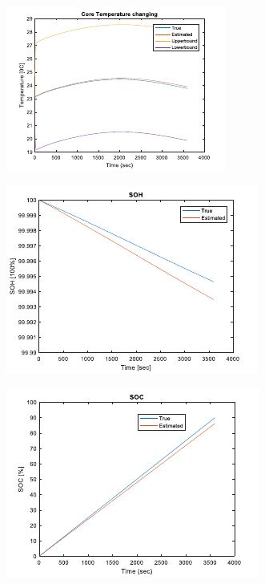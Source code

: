 \documentclass[12pt]{article}
\begin{document}
\begin{figure}[H]
\begin{subfigure}[t]{0.3\linewidth}
		\includegraphics[width=\linewidth]{figures/estTempPar3.pdf}
	\end{subfigure}
	\begin{subfigure}[t]{0.3\linewidth}
		\includegraphics[width=\linewidth]{figures/estTempPar4.pdf}
	\end{subfigure}	
	\begin{subfigure}[t]{0.3\linewidth}
		\includegraphics[width=\linewidth]{figures/estTempPar5.pdf}

\end{subfigure}
\end{figure}
\end{document}
